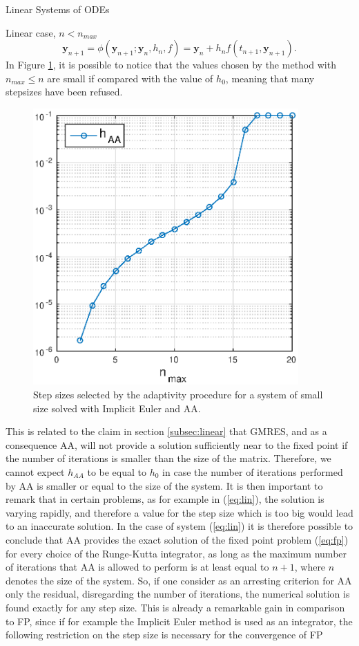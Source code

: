 \documentclass{article}
\begin{document}
\begin{section}{Linear Systems of ODEs}
\begin{subsection}{Linear case, $n < n_{max}$}
\begin{equation}
	\textbf{y}_{n+1} = \phi(\textbf{y}_{n+1}; \textbf{y}_{n}, h_{n}, f) = \textbf{y}_{n} + h_nf(t_{n+1},\textbf{y}_{n+1}).
\end{equation}
In Figure \ref{fig:smallsize}, it is possible to notice that the values chosen by the method with $n_{max} \leq n$ are small if compared with the value of $h_0$, meaning that many stepsizes have been refused. 
\begin{figure}[t!]
\centering
\includegraphics[width=4in]{Pictures/smallsize}
\caption{Step sizes selected by the adaptivity procedure for a system of small size solved with Implicit Euler and AA.}
\label{fig:smallsize}
\end{figure}
This is related to the claim in section \ref{subsec:linear} that GMRES, and as a consequence AA, will not provide a solution sufficiently near to the fixed point if the number of iterations is smaller than the size of the matrix. Therefore, we cannot expect $h_{AA}$ to be equal to $h_0$ in case the number of iterations performed by AA is smaller or equal to the size of the system. It is then important to remark that in certain problems, as for example in (\ref{eq:lin}), the solution is varying rapidly, and therefore a value for the step size which is too big would lead to an inaccurate solution. In the case of system (\ref{eq:lin}) it is therefore possible to conclude that AA provides the exact solution of the fixed point problem (\ref{eq:fp}) for every choice of the Runge-Kutta integrator, as long as the maximum number of iterations that AA is allowed to perform is at least equal to $n+1$, where $n$ denotes the size of the system. So, if one consider as an arresting criterion for AA only the residual, disregarding the number of iterations, the numerical solution is found exactly for any step size. This is already a remarkable gain in comparison to FP, since if for example the Implicit Euler method is used as an integrator, the following restriction on the step size is necessary for the convergence of FP

\end{subsection}
\end{section}
\end{document}

